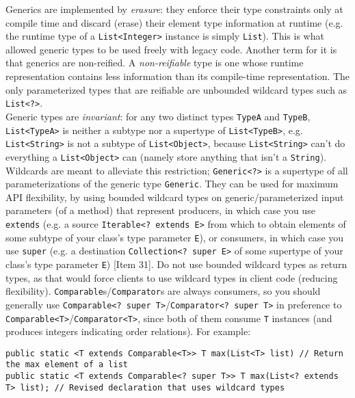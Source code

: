 \documentclass[8pt, table, xcdraw]{article}%
\begin{document}
Generics are implemented by \emph{erasure}: they enforce their type constraints only at compile time and discard (erase) their element type information at runtime (e.g. the runtime type of a \lstinline{List<Integer>} instance is simply \lstinline{List}). This is what allowed generic types to be used freely with legacy code. Another term for it is that generics are non-reified. A \emph{non-reifiable} type is one whose runtime representation contains less information than its compile-time representation. The only parameterized types that are reifiable are unbounded wildcard types such as \lstinline{List<?>}.\\
Generic types are \emph{invariant}: for any two distinct types \lstinline{TypeA} and \lstinline{TypeB}, \lstinline{List<TypeA>} is neither a subtype nor a supertype of \lstinline{List<TypeB>}, e.g. \lstinline{List<String>} is not a subtype of \lstinline{List<Object>}, because \lstinline{List<String>} can't do everything a \lstinline{List<Object>} can (namely store anything that isn't a \lstinline{String}). Wildcards are meant to alleviate this restriction; \lstinline{Generic<?>} is a supertype of all parameterizations of the generic type \lstinline{Generic}. They can be used for maximum API flexibility, by using bounded wildcard types on generic/parameterized input parameters (of a method) that represent producers, in which case you use \lstinline{extends} (e.g. a source \lstinline{Iterable<? extends E>} from which to obtain elements of some subtype of your class's type parameter \lstinline{E}), or consumers, in which case you use \lstinline{super} (e.g. a destination \lstinline{Collection<? super E>} of some supertype of your class's type parameter \lstinline{E}) [Item 31]. Do not use bounded wildcard types as return types, as that would force clients to use wildcard types in client code (reducing flexibility). \lstinline{Comparable}s/\lstinline{Comparator}s are always consumers, so you should generally use \lstinline{Comparable<? super T>}/\lstinline{Comparator<? super T>} in preference to
\lstinline{Comparable<T>}/\lstinline{Comparator<T>}, since both of them consume \lstinline{T} instances (and produces integers indicating order relations). For example:

\begin{lstlisting}
public static <T extends Comparable<T>> T max(List<T> list) // Return the max element of a list
public static <T extends Comparable<? super T>> T max(List<? extends T> list); // Revised declaration that uses wildcard types
\end{lstlisting}
\end{document}
